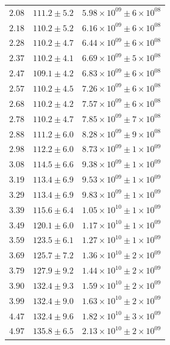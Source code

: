 \documentclass{article}
\begin{document}
\begin{table}[h!]
\begin{tabular}{|c|c|c|}
        $2.08$ & $111.2 \pm 5.2$ & $5.98\times 10^{09} \pm 6\times 10^{08}$ \\
        $2.18$ & $110.2 \pm 5.2$ & $6.16\times 10^{09} \pm 6\times 10^{08}$ \\
        $2.28$ & $110.2 \pm 4.7$ & $6.44\times 10^{09} \pm 6\times 10^{08}$ \\
        $2.37$ & $110.2 \pm 4.1$ & $6.69\times 10^{09} \pm 5\times 10^{08}$ \\
        $2.47$ & $109.1 \pm 4.2$ & $6.83\times 10^{09} \pm 6\times 10^{08}$ \\
        $2.57$ & $110.2 \pm 4.5$ & $7.26\times 10^{09} \pm 6\times 10^{08}$ \\
        $2.68$ & $110.2 \pm 4.2$ & $7.57\times 10^{09} \pm 6\times 10^{08}$ \\
        $2.78$ & $110.2 \pm 4.7$ & $7.85\times 10^{09} \pm 7\times 10^{08}$ \\
        $2.88$ & $111.2 \pm 6.0$ & $8.28\times 10^{09} \pm 9\times 10^{08}$ \\
        $2.98$ & $112.2 \pm 6.0$ & $8.73\times 10^{09} \pm 1\times 10^{09}$ \\
        $3.08$ & $114.5 \pm 6.6$ & $9.38\times 10^{09} \pm 1\times 10^{09}$ \\
        $3.19$ & $113.4 \pm 6.9$ & $9.53\times 10^{09} \pm 1\times 10^{09}$ \\
        $3.29$ & $113.4 \pm 6.9$ & $9.83\times 10^{09} \pm 1\times 10^{09}$ \\
        $3.39$ & $115.6 \pm 6.4$ & $1.05\times 10^{10} \pm 1\times 10^{09}$ \\
        $3.49$ & $120.1 \pm 6.0$ & $1.17\times 10^{10} \pm 1\times 10^{09}$ \\
        $3.59$ & $123.5 \pm 6.1$ & $1.27\times 10^{10} \pm 1\times 10^{09}$ \\
        $3.69$ & $125.7 \pm 7.2$ & $1.36\times 10^{10} \pm 2\times 10^{09}$ \\
        $3.79$ & $127.9 \pm 9.2$ & $1.44\times 10^{10} \pm 2\times 10^{09}$ \\
        $3.90$ & $132.4 \pm 9.3$ & $1.59\times 10^{10} \pm 2\times 10^{09}$ \\
        $3.99$ & $132.4 \pm 9.0$ & $1.63\times 10^{10} \pm 2\times 10^{09}$ \\
        $4.47$ & $132.4 \pm 9.6$ & $1.82\times 10^{10} \pm 3\times 10^{09}$ \\
        $4.97$ & $135.8 \pm 6.5$ & $2.13\times 10^{10} \pm 2\times 10^{09}$ \\

\end{tabular}
\end{table}
\end{document}
